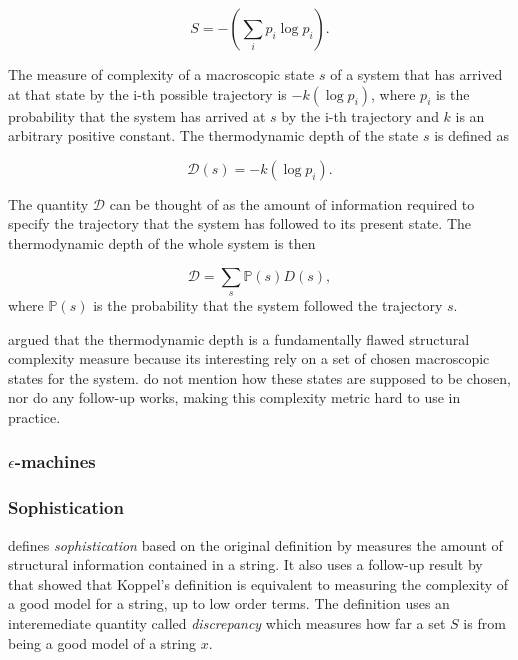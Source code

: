 \begin{equation}
  \label{eq:3}
  S = -\left(\sum_{i} p_{i} \log p_{i}\right).
\end{equation}

The measure of complexity of a macroscopic state $s$ of a system that has
arrived at that state by the i-th possible trajectory is $-k(\log p_{i})$, where
$p_{i}$ is the probability that the system has arrived at $s$ by the i-th
trajectory and $k$ is an arbitrary positive constant. The thermodynamic depth of
the state $s$ is defined as

\begin{equation}
  \label{eq:4}
  \mathcal{D}(s) = -k(\log p_{i}).
\end{equation}

The quantity $\mathcal{D}$ can be thought of as the amount of information
required to specify the trajectory that the system has followed to its present
state. The thermodynamic depth of the whole system is then

\begin{equation}
  \label{eq:5}
  \mathcal{D} = \sum_{s}\mathbb{P}(s)D(s),
\end{equation}
where $\mathbb{P}(s)$ is the probability that the system followed the
trajectory $s$.

\textcite{crutchfieldThermodynamicDepthCausal1999} argued that the thermodynamic
depth is a fundamentally flawed structural complexity measure because its
interesting rely on a set of chosen macroscopic states for the system.
\textcite{lloydComplexityThermodynamicDepth1988} do not mention how these states
are supposed to be chosen, nor do any follow-up works, making this complexity
metric hard to use in practice.

\subsubsection{$\epsilon$-machines}

\parencite{crutchfieldInferringStatisticalComplexity1989,
  crutchfieldCalculiEmergenceComputation1994,
  feldmanMeasuresStatisticalComplexity1998}

\subsubsection{Sophistication}

\textcite{motaSophisticationRandomnessDeficiency2013} defines
\emph{sophistication} based on the original definition by
\textcite{koppelStructure1988, koppelAlmostMachineindependentTheory1991a}
measures the amount of structural information contained in a string. It also
uses a follow-up result by \parencite{vitanyiMeaningfulInformation2006} that
showed that Koppel's definition is equivalent to measuring the complexity of a
good model for a string, up to low order terms. The definition uses an
interemediate quantity called \emph{discrepancy} which measures how far a set
$S$ is from being a good model of a string $x$.

